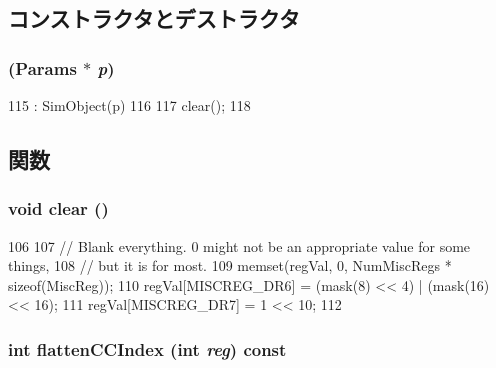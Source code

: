 \subsection{コンストラクタとデストラクタ}
\hypertarget{classX86ISA_1_1ISA_ae9132e021b3f3b20c917fc328a056bbd}{
\subsubsection[{ISA}]{ ({\bf Params} $\ast$ {\em p})}}
\label{classX86ISA_1_1ISA_ae9132e021b3f3b20c917fc328a056bbd}



\begin{DoxyCode}
115     : SimObject(p)
116 {
117     clear();
118 }
\end{DoxyCode}


\subsection{関数}
\hypertarget{classX86ISA_1_1ISA_ac8bb3912a3ce86b15842e79d0b421204}{
\subsubsection[{clear}]{\setlength{\rightskip}{0pt plus 5cm}void clear ()}}
\label{classX86ISA_1_1ISA_ac8bb3912a3ce86b15842e79d0b421204}



\begin{DoxyCode}
106 {
107     // Blank everything. 0 might not be an appropriate value for some things,
108     // but it is for most.
109     memset(regVal, 0, NumMiscRegs * sizeof(MiscReg));
110     regVal[MISCREG_DR6] = (mask(8) << 4) | (mask(16) << 16);
111     regVal[MISCREG_DR7] = 1 << 10;
112 }
\end{DoxyCode}
\hypertarget{classX86ISA_1_1ISA_a7a5d7476bd10e5af09e6e753d1fca087}{
\subsubsection[{flattenCCIndex}]{\setlength{\rightskip}{0pt plus 5cm}int flattenCCIndex (int {\em reg}) const}}
\label{classX86ISA_1_1ISA_a7a5d7476bd10e5af09e6e753d1fca087}



